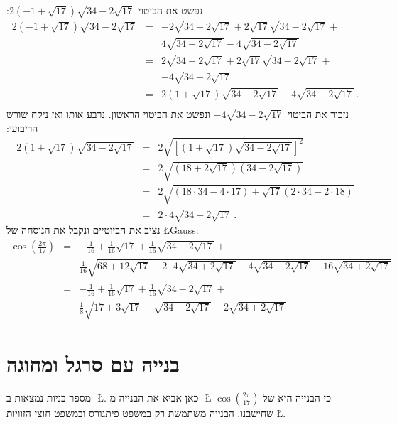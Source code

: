 \documentclass[11pt,a4paper]{article}
\newenvironment{form}[1]{%
\begin{displaymath}%
\renewcommand{\arraystretch}{#1}%
\begin{array}{lcl}}%
{\end{array}%
\end{displaymath}%
}
\newcommand*{\disfrac}[2]{\displaystyle\frac{#1}{#2}}
\begin{document}
נפשט את הביטוי
$2(-1+\sqrt{17})\sqrt{34-2\sqrt{17}}$:
\begin{form}{1.7}
2(-1+\sqrt{17})\sqrt{34-2\sqrt{17}} &=&
-2\sqrt{34-2\sqrt{17}} +2\sqrt{17}\sqrt{34-2\sqrt{17}}+\\
&&4\sqrt{34-2\sqrt{17}}-4\sqrt{34-2\sqrt{17}}\\
&=&
2\sqrt{34-2\sqrt{17}} +2\sqrt{17}\sqrt{34-2\sqrt{17}}+\\
&&-4\sqrt{34-2\sqrt{17}}\\
&=&2(1+\sqrt{17})\sqrt{34-2\sqrt{17}}-4\sqrt{34-2\sqrt{17}}\,.\\
\end{form}
נזכור את הביטוי
$-4\sqrt{34-2\sqrt{17}}$
ונפשט את הביטוי הראשון. נרבע אותו ואז ניקח שורש הריבועי:
\begin{form}{1.8}
2(1+\sqrt{17})\sqrt{34-2\sqrt{17}}&=&
2\sqrt{\left[(1+\sqrt{17})\sqrt{34-2\sqrt{17}}\right]^2}\\
&=&2\sqrt{(18+2\sqrt{17})(34-2\sqrt{17})}\\
&=&2\sqrt{(18\cdot 34-4\cdot17)+\sqrt{17}(2\cdot 34 - 2\cdot 18)}\\
&=&2\cdot 4\sqrt{34+2\sqrt{17}}\,.
\end{form}
נציב את הביוטיים ונקבל את הנוסחה של \L{Gauss}:
\begin{form}{2.2}
\cos\left(\disfrac{2\pi}{17}\right) &=& 
-\disfrac{1}{16}+\disfrac{1}{16}\sqrt{17} + 
     \disfrac{1}{16}\sqrt{34-2\sqrt{17}}
    + \\
    &&
     \disfrac{1}{16}\sqrt{
     68+12\sqrt{17} + 
     2\cdot 4\sqrt{34+2\sqrt{17}}-4\sqrt{34-2\sqrt{17}}
   -16
     \sqrt{34+2\sqrt{17}}
   }\\
&=&-\disfrac{1}{16}+\frac{1}{16}\sqrt{17} + 
     \disfrac{1}{16}\sqrt{34-2\sqrt{17}}
    + \\
    &&
     \disfrac{1}{8}\sqrt{
     17+3\sqrt{17} - 
     \sqrt{34-2\sqrt{17}}
   -2
     \sqrt{34+2\sqrt{17}}
   }
\end{form}

\newpage

\section{בנייה עם סרגל ומחוגה}\label{s.construction}

מספר בניות נמצאות ב-%
\L{\cite{wiki:heptadecagon}}.
כאן אביא את הבנייה מ-%
\L{\cite{callagy}}
כי הבנייה היא של
$\cos\left( \disfrac{2\pi}{17}\right)$
שחישבנו.
הבנייה משתמשת רק במשפט פיתגורס ובמשפט חוצי הזוויות
\L{\cite{wiki:bisector}}.
\end{document}
